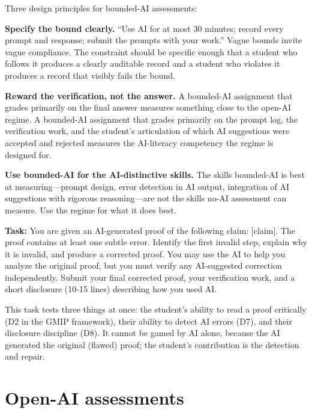 \documentclass[11pt]{book}
\begin{document}
Three design principles for bounded-AI assessments:

\textbf{Specify the bound clearly.} ``Use AI for at most 30 minutes; record every prompt and response; submit the prompts with your work.'' Vague bounds invite vague compliance. The constraint should be specific enough that a student who follows it produces a clearly auditable record and a student who violates it produces a record that visibly fails the bound.

\textbf{Reward the verification, not the answer.} A bounded-AI assignment that grades primarily on the final answer measures something close to the open-AI regime. A bounded-AI assignment that grades primarily on the prompt log, the verification work, and the student's articulation of which AI suggestions were accepted and rejected measures the AI-literacy competency the regime is designed for.

\textbf{Use bounded-AI for the AI-distinctive skills.} The skills bounded-AI is best at measuring---prompt design, error detection in AI output, integration of AI suggestions with rigorous reasoning---are not the skills no-AI assessment can measure. Use the regime for what it does best.

\begin{example}
\textbf{Task:} You are given an AI-generated proof of the following claim: [claim]. The proof contains at least one subtle error. Identify the first invalid step, explain why it is invalid, and produce a corrected proof. You may use the AI to help you analyze the original proof, but you must verify any AI-suggested correction independently. Submit your final corrected proof, your verification work, and a short disclosure (10-15 lines) describing how you used AI.

\medskip
This task tests three things at once: the student's ability to read a proof critically (D2 in the GMIP framework), their ability to detect AI errors (D7), and their disclosure discipline (D8). It cannot be gamed by AI alone, because the AI generated the original (flawed) proof; the student's contribution is the detection and repair.
\end{example}

\section{Open-AI assessments}
\end{document}
